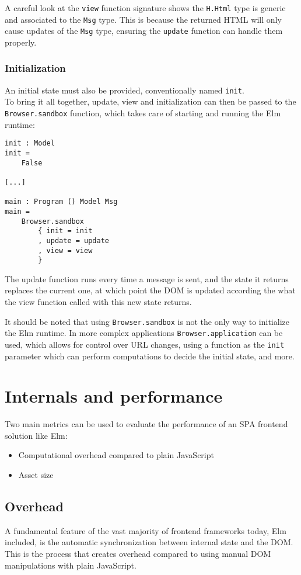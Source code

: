 A careful look at the \texttt{view} function signature shows the \texttt{H.Html} type is generic and associated to the \texttt{Msg} type. This is because the returned HTML will only cause updates of the \texttt{Msg} type, ensuring the \texttt{update} function can handle them properly.

\subsubsection{Initialization}
An initial state must also be provided, conventionally named \texttt{init}.\\
To bring it all together, update, view and initialization can then be passed to the \texttt{Browser.sandbox} function, which takes care of starting and running the Elm runtime:
\begin{verbatim}
init : Model
init =
    False

[...]

main : Program () Model Msg
main =
    Browser.sandbox
        { init = init
        , update = update
        , view = view
        }
\end{verbatim}

The update function runs every time a message is sent, and the state it returns replaces the current one, at which point the DOM is updated according the what the view function called with this new state returns.

It should be noted that using \texttt{Browser.sandbox} is not the only way to initialize the Elm runtime. In more complex applications \texttt{Browser.application} can be used, which allows for control over URL changes, using a function as the \texttt{init} parameter which can perform computations to decide the initial state, and more.

\section{Internals and performance}
Two main metrics can be used to evaluate the performance of an SPA frontend solution like Elm:
\begin{itemize}
    \item Computational overhead compared to plain JavaScript
    \item Asset size
\end{itemize}

\subsection{Overhead}
A fundamental feature of the vast majority of frontend frameworks today, Elm included, is the automatic synchronization between internal state and the DOM. This is the process that creates overhead compared to using manual DOM manipulations with plain JavaScript.\\

